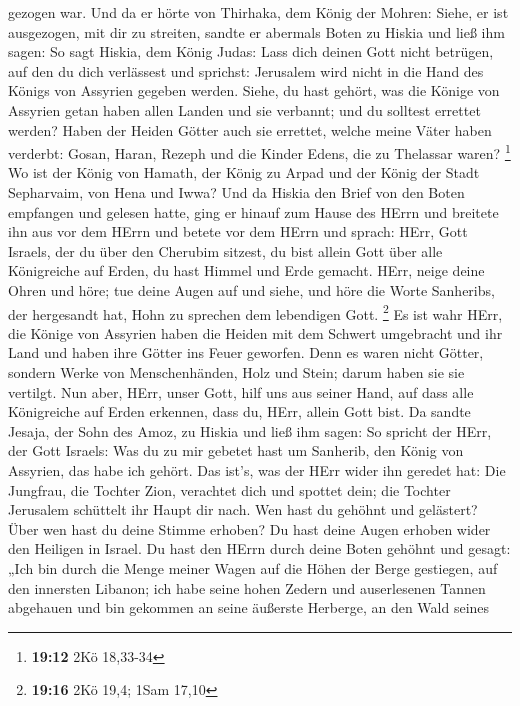 gezogen war.  Und da er hörte von Thirhaka, dem König der
Mohren: Siehe, er ist ausgezogen, mit dir zu streiten, sandte er
abermals Boten zu Hiskia und ließ ihm sagen:  So sagt
Hiskia, dem König Judas: Lass dich deinen Gott nicht betrügen, auf den
du dich verlässest und sprichst: Jerusalem wird nicht in die Hand des
Königs von Assyrien gegeben werden.  Siehe, du hast gehört,
was die Könige von Assyrien getan haben allen Landen und sie verbannt;
und du solltest errettet werden?  Haben der Heiden Götter
auch sie errettet, welche meine Väter haben verderbt: Gosan, Haran,
Rezeph und die Kinder Edens, die zu Thelassar waren? \footnote{\textbf{19:12}
  2Kö 18,33-34}  Wo ist der König von Hamath, der König zu
Arpad und der König der Stadt Sepharvaim, von Hena und Iwwa?
 Und da Hiskia den Brief von den Boten empfangen und
gelesen hatte, ging er hinauf zum Hause des HErrn und breitete ihn aus
vor dem HErrn  und betete vor dem HErrn und sprach: HErr,
Gott Israels, der du über den Cherubim sitzest, du bist allein Gott über
alle Königreiche auf Erden, du hast Himmel und Erde gemacht.
 HErr, neige deine Ohren und höre; tue deine Augen auf und
siehe, und höre die Worte Sanheribs, der hergesandt hat, Hohn zu
sprechen dem lebendigen Gott. \footnote{\textbf{19:16} 2Kö 19,4; 1Sam
  17,10}  Es ist wahr HErr, die Könige von Assyrien haben
die Heiden mit dem Schwert umgebracht und ihr Land  und
haben ihre Götter ins Feuer geworfen. Denn es waren nicht Götter,
sondern Werke von Menschenhänden, Holz und Stein; darum haben sie sie
vertilgt.  Nun aber, HErr, unser Gott, hilf uns aus seiner
Hand, auf dass alle Königreiche auf Erden erkennen, dass du, HErr,
allein Gott bist.  Da sandte Jesaja, der Sohn des Amoz, zu
Hiskia und ließ ihm sagen: So spricht der HErr, der Gott Israels: Was du
zu mir gebetet hast um Sanherib, den König von Assyrien, das habe ich
gehört.  Das ist's, was der HErr wider ihn geredet hat: Die
Jungfrau, die Tochter Zion, verachtet dich und spottet dein; die Tochter
Jerusalem schüttelt ihr Haupt dir nach.  Wen hast du
gehöhnt und gelästert? Über wen hast du deine Stimme erhoben? Du hast
deine Augen erhoben wider den Heiligen in Israel.  Du hast
den HErrn durch deine Boten gehöhnt und gesagt: „Ich bin durch die Menge
meiner Wagen auf die Höhen der Berge gestiegen, auf den innersten
Libanon; ich habe seine hohen Zedern und auserlesenen Tannen abgehauen
und bin gekommen an seine äußerste Herberge, an den Wald seines
